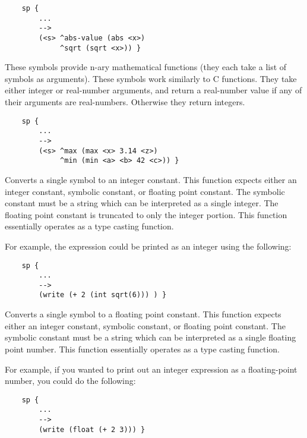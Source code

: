 \begin{description}
	\begin{verbatim}
	sp {
	    ...
	    -->
	    (<s> ^abs-value (abs <x>)
	         ^sqrt (sqrt <x>)) }
	\end{verbatim}

\item [\soarb{min, max} --- ]   
	These symbols provide n-ary mathematical functions (they each take a list of symbols as arguments). These symbols work similarly to C functions. They take either integer or real-number arguments, and return a real-number value if any of their arguments are real-numbers. Otherwise they return integers.

	\begin{verbatim}
	sp {
		...
		-->
		(<s> ^max (max <x> 3.14 <z>)
		     ^min (min <a> <b> 42 <c>)) }
	\end{verbatim}


\item [\soarb{int} --- ] 
	Converts a single symbol to an integer constant. This function expects either an integer constant, symbolic constant, or floating point constant. The symbolic constant must be a string which can be interpreted as a single integer. The floating point constant is truncated to only the integer portion. This function essentially operates as a type casting function.
	
	For example, the expression  could be printed as an integer using the following:

	\begin{verbatim}
	sp {
	    ...
	    -->
	    (write (+ 2 (int sqrt(6))) ) }
	\end{verbatim}

\item [\soarb{float} --- ] 
	Converts a single symbol to a floating point constant. This function expects either an integer constant, symbolic constant, or floating point constant. The symbolic constant must be a string which can be interpreted as a single floating point number. This function essentially operates as a type casting function. 

	For example, if you wanted to print out an integer expression as a floating-point number, you could do the following:

	\begin{verbatim}
	sp {
	    ...
	    -->
	    (write (float (+ 2 3))) }
	\end{verbatim}


\end{description}
